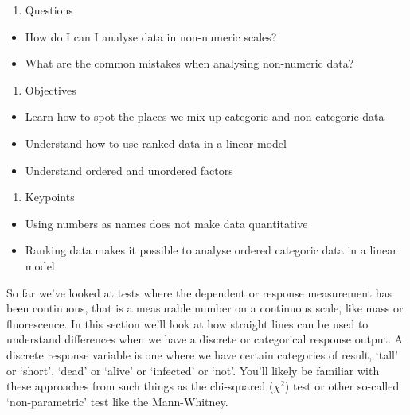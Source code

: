\documentclass[
]{book}
\providecommand{\tightlist}{%
  \setlength{\itemsep}{0pt}\setlength{\parskip}{0pt}}
\begin{document}
\begin{enumerate}
\def\labelenumi{\arabic{enumi}.}
\tightlist
\item
  Questions
\end{enumerate}

\begin{itemize}
\tightlist
\item
  How do I can I analyse data in non-numeric scales?
\item
  What are the common mistakes when analysing non-numeric data?
\end{itemize}

\begin{enumerate}
\def\labelenumi{\arabic{enumi}.}
\setcounter{enumi}{1}
\tightlist
\item
  Objectives
\end{enumerate}

\begin{itemize}
\tightlist
\item
  Learn how to spot the places we mix up categoric and non-categoric data
\item
  Understand how to use ranked data in a linear model
\item
  Understand ordered and unordered factors
\end{itemize}

\begin{enumerate}
\def\labelenumi{\arabic{enumi}.}
\setcounter{enumi}{2}
\tightlist
\item
  Keypoints
\end{enumerate}

\begin{itemize}
\tightlist
\item
  Using numbers as names does not make data quantitative
\item
  Ranking data makes it possible to analyse ordered categoric data in a linear model
\end{itemize}

So far we've looked at tests where the dependent or response measurement has been continuous, that is a measurable number on a continuous scale, like mass or fluorescence. In this section we'll look at how straight lines can be used to understand differences when we have a discrete or categorical response output. A discrete response variable is one where we have certain categories of result, `tall' or `short', `dead' or `alive' or `infected' or `not'. You'll likely be familiar with these approaches from such things as the chi-squared (\(\chi^2\)) test or other so-called `non-parametric' test like the Mann-Whitney.
\end{document}
